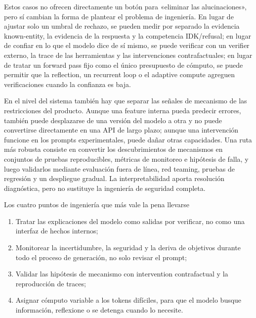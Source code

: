 Estos casos no ofrecen directamente un botón para «eliminar las alucinaciones», pero sí cambian la forma de plantear el problema de ingeniería. En lugar de ajustar solo un umbral de rechazo, se pueden medir por separado la evidencia known-entity, la evidencia de la respuesta y la competencia IDK/refusal; en lugar de confiar en lo que el modelo dice de sí mismo, se puede verificar con un verifier externo, la trace de las herramientas y las intervenciones contrafactuales; en lugar de tratar un forward pass fijo como el único presupuesto de cómputo, se puede permitir que la reflection, un recurrent loop o el adaptive compute agreguen verificaciones cuando la confianza es baja.

En el nivel del sistema también hay que separar las señales de mecanismo de las restricciones del producto. Aunque una feature interna pueda predecir errores, también puede desplazarse de una versión del modelo a otra y no puede convertirse directamente en una API de largo plazo; aunque una intervención funcione en los prompts experimentales, puede dañar otras capacidades. Una ruta más robusta consiste en convertir los descubrimientos de mecanismos en conjuntos de pruebas reproducibles, métricas de monitoreo e hipótesis de falla, y luego validarlos mediante evaluación fuera de línea, red teaming, pruebas de regresión y un despliegue gradual. La interpretabilidad aporta resolución diagnóstica, pero no sustituye la ingeniería de seguridad completa.


\begin{importantbox}{Los cuatro puntos de ingeniería que más vale la pena llevarse}
\begin{enumerate}
  \item Tratar las explicaciones del modelo como salidas por verificar, no como una interfaz de hechos internos;
  \item Monitorear la incertidumbre, la seguridad y la deriva de objetivos durante todo el proceso de generación, no solo revisar el prompt;
  \item Validar las hipótesis de mecanismo con intervention contrafactual y la reproducción de traces;
  \item Asignar cómputo variable a los tokens difíciles, para que el modelo busque información, reflexione o se detenga cuando lo necesite.
\end{enumerate}
\end{importantbox}

